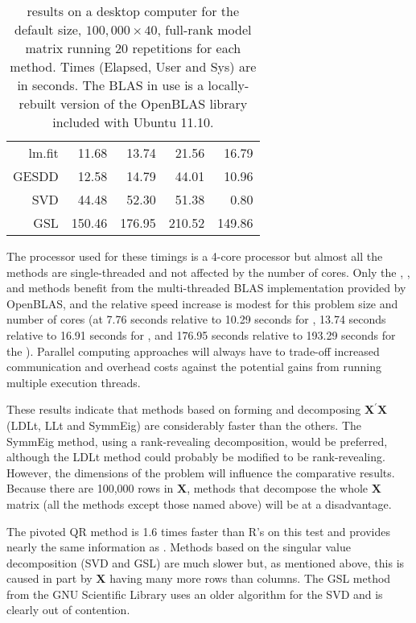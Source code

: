 \documentclass[shortnames,article]{jss}
\begin{document}
\begin{table}[tb]
\begin{tabular}{r r r r r}
   lm.fit &   11.68 &   13.74 &     21.56 &    16.79 \\
    GESDD &   12.58 &   14.79 &     44.01 &    10.96 \\
      SVD &   44.48 &   52.30 &     51.38 &     0.80 \\
      GSL &  150.46 &  176.95 &    210.52 &   149.86 \\
     \bottomrule
  \end{tabular}
  \caption{ results on a desktop computer for the
    default size, $100,000\times 40$, full-rank model matrix running
    20 repetitions for each method.  Times (Elapsed, User and Sys) are
    in seconds.  The BLAS in use is a locally-rebuilt version of the 
    OpenBLAS library included with Ubuntu 11.10.}
  \label{tab:lmRes}
\end{table}
The processor used for these timings is a 4-core processor but almost all the
methods are single-threaded and not affected by the number of cores.  Only
the , ,  and  methods benefit from the
multi-threaded BLAS implementation provided by OpenBLAS, and the relative
speed increase is modest for this problem size and number of cores (at 7.76
seconds relative to 10.29 seconds for , 13.74 seconds relative to
16.91 seconds for , and 176.95 seconds relative to 193.29
seconds for the ). Parallel computing approaches will always have
to trade-off increased communication and overhead costs against the potential
gains from running multiple execution threads. %

These results indicate that methods based on forming and decomposing
$\bm X^\prime\bm X$ (LDLt, LLt and SymmEig) are considerably
faster than the others.  The SymmEig method, using a rank-revealing
decomposition, would be preferred, although the LDLt method could
probably be modified to be rank-revealing.  However, the
dimensions of the problem will influence the comparative results.
Because there are 100,000 rows in $\bm X$, methods that decompose the
whole $\bm X$ matrix (all the methods except those named above) will
be at a disadvantage.

The pivoted QR method is 1.6 times faster than R's  on
this test and provides nearly the same information as .
Methods based on the singular value decomposition (SVD and GSL) are
much slower but, as mentioned above, this is caused in part by $\bm X$
having many more rows than columns.  The GSL method from the GNU
Scientific Library uses an older algorithm for the SVD and is clearly
out of contention.
\end{document}
